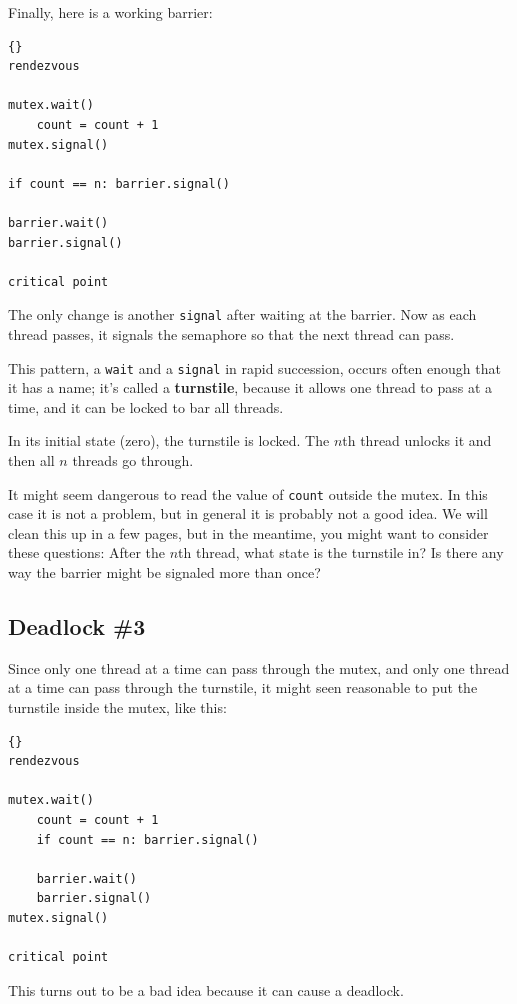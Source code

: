 \documentclass{book}
\newcommand{\clearemptydoublepage}{\newpage\cleardoublepage}
\begin{document}
Finally, here is a working barrier:

\begin{lstlisting}[caption={Barrier solution}]{}
rendezvous

mutex.wait()
    count = count + 1
mutex.signal()

if count == n: barrier.signal()

barrier.wait()
barrier.signal()

critical point
\end{lstlisting}

The only change is another {\tt signal} after waiting
at the barrier.  Now as each thread passes, it signals the
semaphore so that the next thread can pass.

This pattern, a {\tt wait} and a {\tt signal} in rapid
succession, occurs often enough that it has a name;
it's called a {\bf turnstile}, because it allows one thread to pass
at a time, and it can be locked to bar all threads.

In its initial state (zero), the turnstile is locked.  The $n$th
thread unlocks it and then all $n$ threads go through.

It might seem dangerous to read the value of {\tt count} outside the
mutex.  In this case it is not a problem, but in general it is
probably not a good idea.  We will clean this up in a few pages, but
in the meantime, you might want to consider these questions: After the
$n$th thread, what state is the turnstile in?  Is there any way the
barrier might be signaled more than once?


\clearemptydoublepage
\subsection {Deadlock \#3}

Since only one thread at a time can pass through the
mutex, and only one thread at a time can pass through
the turnstile, it might seen reasonable to put the
turnstile inside the mutex, like this:

\begin{lstlisting}[caption={Bad barrier solution}]{}
rendezvous

mutex.wait()
    count = count + 1
    if count == n: barrier.signal()

    barrier.wait()
    barrier.signal()
mutex.signal()

critical point
\end{lstlisting}

This turns out to be a bad idea because it can cause a
deadlock.
\end{document}
